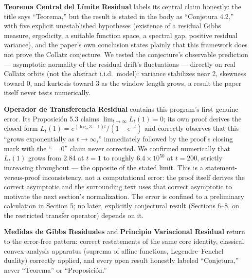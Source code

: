 \documentclass[11pt]{article}
\begin{document}
\textbf{Teorema Central del Límite Residual} \cite{RuizCastillo2026c}
labels its central claim honestly: the title says ``Teorema,'' but the
result is stated in the body as ``Conjetura 4.2,'' with five explicit
unestablished hypotheses (existence of a residual Gibbs measure,
ergodicity, a suitable function space, a spectral gap, positive
residual variance), and the paper's own conclusion states plainly that
this framework does not prove the Collatz conjecture. We tested the
conjecture's observable prediction --- asymptotic normality of the
residual drift's fluctuations --- directly on real Collatz orbits
(not the abstract i.i.d.\ model): variance stabilizes near 2, skewness
toward 0, and kurtosis toward 3 as the window length grows, a result
the paper itself never tests numerically.

\textbf{Operador de Transferencia Residual} \cite{RuizCastillo2026d}
contains this program's first genuine error. Its Proposición 5.3
claims $\lim_{t\to\infty} L_t(1) = 0$; its own proof derives the closed
form $L_t(1) = e^{(\log_2 3 - 1)t}/(1-e^{-t})$ and correctly observes
that this ``grows exponentially as $t\to\infty$,'' immediately followed
by the proof's closing mark with the ``$=0$'' claim never corrected. We
confirmed numerically that $L_t(1)$ grows from 2.84 at $t=1$ to
roughly $6.4\times 10^{50}$ at $t=200$, strictly increasing throughout
--- the opposite of the stated limit. This is a statement-versus-proof
inconsistency, not a computational error: the proof itself derives the
correct asymptotic and the surrounding text uses that correct
asymptotic to motivate the next section's normalization. The error is
confined to a preliminary calculation in Section 5; no later,
explicitly conjectural result (Sections 6--8, on the restricted
transfer operator) depends on it.

\textbf{Medidas de Gibbs Residuales} \cite{RuizCastillo2026e} and
\textbf{Principio Variacional Residual} \cite{RuizCastillo2026f} return
to the error-free pattern: correct restatements of the same core
identity, classical convex-analysis apparatus (suprema of affine
functions, Legendre--Fenchel duality) correctly applied, and every open
result honestly labeled ``Conjetura,'' never ``Teorema'' or
``Proposición.''
\end{document}
